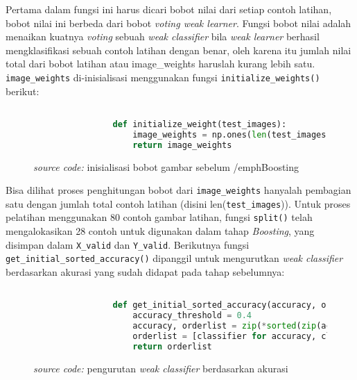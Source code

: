 		Pertama dalam fungsi ini harus dicari bobot nilai dari setiap contoh latihan, 
		bobot nilai ini berbeda dari bobot \emph{voting weak learner}. Fungsi bobot nilai 
		adalah menaikan kuatnya \textit{voting} sebuah \textit{weak classifier} 
		bila \emph{weak learner} berhasil mengklasifikasi sebuah 
		contoh latihan dengan benar, oleh karena itu jumlah nilai total dari bobot 
		latihan atau image\_weights haruslah kurang lebih satu. \texttt{image\_weights} di-inisialisasi 
		menggunakan fungsi \texttt{initialize\_weights()} berikut:

		\begin{figure}[H]
			\begin{lstlisting}[language=Python, basicstyle=\tiny]

				def initialize_weight(test_images):
					image_weights = np.ones(len(test_images)) / len(test_images)
					return image_weights
			\end{lstlisting}
			\caption{\emph{source code:} inisialisasi bobot gambar sebelum /emph{Boosting}}
			\label{code: initialize image weights}
		\end{figure}

		Bisa dilihat proses penghitungan bobot dari \texttt{image\_weights} hanyalah pembagian 
		satu dengan jumlah total contoh latihan (disini len(\texttt{test\_images})). Untuk proses 
		pelatihan menggunakan 80 contoh gambar latihan, fungsi \texttt{split()} telah mengalokasikan 
		28 contoh untuk digunakan dalam tahap \emph{Boosting}, yang disimpan dalam \texttt{X\_valid} 
		dan \texttt{Y\_valid}. Berikutnya fungsi \texttt{get\_initial\_sorted\_accuracy()} dipanggil untuk 
		mengurutkan \emph{weak classifier} berdasarkan akurasi yang sudah didapat pada tahap sebelumnya:

		\begin{figure}[H]
			\begin{lstlisting}[language=Python, basicstyle=\tiny]

				def get_initial_sorted_accuracy(accuracy, orderlist):
					accuracy_threshold = 0.4
					accuracy, orderlist = zip(*sorted(zip(accuracy, orderlist), reverse = True))
					orderlist = [classifier for accuracy, classifier in zip(accuracy, orderlist) if accuracy >= accuracy_threshold]
					return orderlist

			\end{lstlisting}
			\caption{\emph{source code:} pengurutan \emph{weak classifier} berdasarkan akurasi}
			\label{code: initial sorted accyracy}
		\end{figure}

